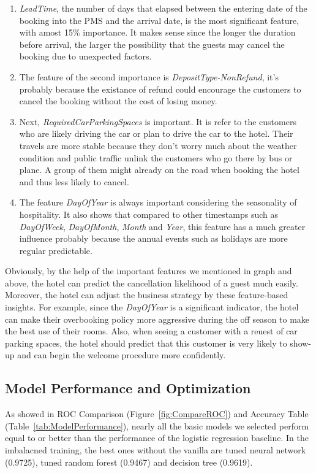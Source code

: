 \documentclass[10pt,twocolumn,letterpaper]{article}
\begin{document}
\begin{enumerate}
    \item \emph{LeadTime}, the number of days that elapsed between the entering date of the booking into the PMS and the arrival date, is the most significant feature, with amost 15\% importance. It makes sense since the longer the duration before arrival, the larger the possibility that the guests may cancel the booking due to unexpected factors.
    \item The feature of the second importance is \emph{DepositType-NonRefund}, it's probably because the existance of refund could encourage the customers to cancel the booking without the cost of losing money.
    \item Next, \emph{RequiredCarParkingSpaces} is important. It is refer to the customers who are likely driving the car or plan to drive the car to the hotel. Their travels are more stable because they don't worry much about the weather condition and public traffic unlink the customers who go there by bus or plane. A group of them might already on the road when booking the hotel and thus less likely to cancel.
    \item The feature \emph{DayOfYear} is always important considering the seasonality of hospitality. It also shows that compared to other timestamps such as \emph{DayOfWeek}, \emph{DayOfMonth}, \emph{Month} and \emph{Year}, this feature has a much greater influence probably because the annual events such as holidays are more regular predictable. 
\end{enumerate}

Obviously, by the help of the important features we mentioned in graph and above, the hotel can predict the cancellation likelihood of a guest much easily. Moreover, the hotel can adjust the business strategy by these feature-based insights. For example, since the \emph{DayOfYear} is a significant indicator, the hotel can make their overbooking policy more aggressive during the off season to make the best use of their rooms. Also, when seeing a customer with a reuest of car parking spaces, the hotel should predict that this customer is very likely to show-up and can begin the welcome procedure more confidently.


\subsection{Model Performance and Optimization}
As showed in ROC Comparison (Figure~\ref{fig:CompareROC}) and Accuracy Table (Table~\ref{tab:ModelPerformance}), nearly all the basic models we selected perform equal to or better than the performance of the logistic regression baseline. In the imbalacned training, the best ones without the vanilla are tuned neural network (0.9725), tuned random forest (0.9467) and decision tree (0.9619). 
\end{document}

